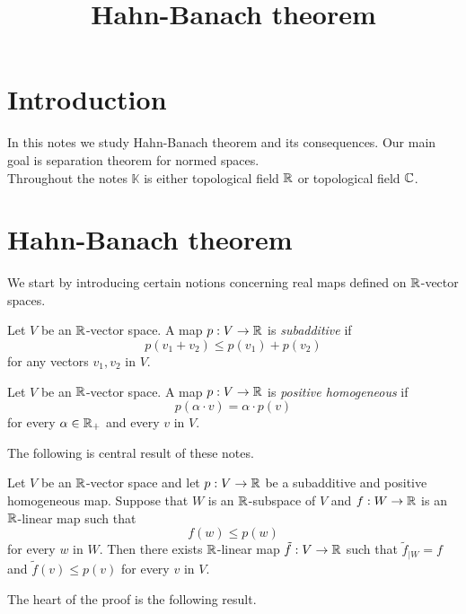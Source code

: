 



\title{Hahn-Banach theorem}
\date{}
\maketitle

\section{Introduction}
\noindent
In this notes we study Hahn-Banach theorem and its consequences. Our main goal is separation theorem for normed spaces.\\
Throughout the notes $\mathbb{K}$ is either topological field ${\mathbb R}$ or topological field ${\mathbb C}$.

\section{Hahn-Banach theorem}
\noindent
We start by introducing certain notions concerning real maps defined on ${\mathbb R}$-vector spaces.

\begin{definition}
Let $V$ be an ${\mathbb R}$-vector space. A map $p:V\rightarrow {\mathbb R}$ is \textit{subadditive} if 
$$p(v_1 + v_2)\leq p(v_1) + p(v_2)$$
for any vectors $v_1,v_2$ in $V$.
\end{definition}

\begin{definition}
Let $V$ be an ${\mathbb R}$-vector space. A map $p:V\rightarrow {\mathbb R}$ is \textit{positive homogeneous} if 
$$p(\alpha \cdot v) = \alpha \cdot p(v)$$
for every $\alpha \in {\mathbb R}_+$ and every $v$ in $V$.
\end{definition}
\noindent
The following is central result of these notes.

\begin{theorem}\label{theorem:hahn_banach_theorem}
Let $V$ be an ${\mathbb R}$-vector space and let $p:V\rightarrow {\mathbb R}$ be a subadditive and positive homogeneous map. Suppose that $W$ is an ${\mathbb R}$-subspace of $V$ and $f:W\rightarrow {\mathbb R}$ is an ${\mathbb R}$-linear map such that
$$f(w) \leq p(w)$$
for every $w$ in $W$. Then there exists ${\mathbb R}$-linear map $\tilde{f}:V\rightarrow {\mathbb R}$ such that $\tilde{f}_{\mid W} = f$ and $\tilde{f}(v) \leq p(v)$ for every $v$ in $V$.
\end{theorem}
\noindent
The heart of the proof is the following result.

